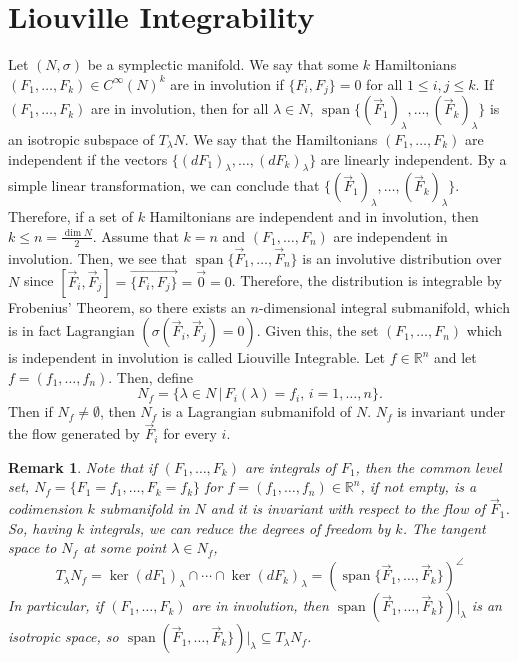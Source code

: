 \documentclass{article}
\newcommand{\R}{\mathbb R}
\newcommand{\nl}{\newline\newline\noindent}
\DeclareMathOperator{\spn}{span}
\newtheorem{rk}{Remark}
\begin{document}
\section{Liouville Integrability}
Let $(N,\sigma)$ be a symplectic manifold. We say that some $k$ Hamiltonians $(F_1,\dots,F_k)\in C^\infty(N)^k$  are in involution if $\{F_i,F_j\} = 0$ for all $1\leq i,j\leq k$. If $(F_1,\dots, F_k)$ are in involution, then for all $\lambda \in N$, $\spn\{(\vec F_1)_\lambda,\dots,(\vec F_k)_\lambda\}$ is an isotropic subspace of $T_\lambda N$.
\nl
We say that the Hamiltonians $(F_1,\dots,F_k)$ are independent if the vectors $\{(dF_1)_\lambda,\dots,(dF_k)_\lambda\}$ are linearly independent. By a simple linear transformation, we can conclude that $\{(\vec F_1)_\lambda,\dots,(\vec F_k)_\lambda\}$. Therefore, if a set of $k$ Hamiltonians are independent and in involution, then $k\leq n = \frac{\dim N}{2}$.
\nl
Assume that $k=n$ and $(F_1,\dots,F_n)$ are independent in involution. Then, we see that $\spn\{\vec F_1,\dots,\vec F_n\}$  is an involutive distribution over $N$ since $[\vec F_i, \vec F_j] =\overrightarrow{\{F_i,F_j\}} = \vec 0 = 0$. Therefore, the distribution is integrable by Frobenius' Theorem, so there exists an $n$-dimensional integral submanifold, which is in fact Lagrangian $(\sigma(\vec F_i,\vec F_j) = 0)$. Given this, the set $(F_1,\dots,F_n)$ which is independent in involution is called Liouville Integrable. Let $f\in \R^n$ and let $f = (f_1,\dots,f_n)$. Then, define
\[N_f = \{\lambda\in N\,|\,F_i(\lambda) = f_i,\,i=1,\dots,n\}.\]
Then if $N_f\neq \emptyset$, then $N_f$ is a Lagrangian submanifold of $N$. $N_f$ is invariant under the flow generated by $\vec F_i$ for every $i$.
\begin{rk}
    Note that if $(F_1,\dots,F_k)$ are integrals of $F_1$, then the common level set, $N_f = \{F_1=f_1,\dots,F_k=f_k\}$ for $f=(f_1,\dots,f_n)\in\R^n$, if not empty, is a codimension $k$ submanifold in $N$ and it is invariant with respect to the flow of $\vec F_1$. So, having $k$ integrals, we can reduce the degrees of freedom by $k$. The tangent space to $N_f$ at some point $\lambda\in N_f$,
    \[T_\lambda N_f = \ker (dF_1)_\lambda\cap\cdots\cap\ker(dF_k)_\lambda = \left(\spn\{\vec F_1,\dots,\vec F_k\}\right)^\angle\]
    In particular, if $(F_1,\dots,F_k)$ are in involution, then $\spn\left(\vec F_1, \dots, \vec F_k\}\right)\big|_\lambda$ is an isotropic space, so $\spn\left(\vec F_1, \dots, \vec F_k\}\right)\big|_\lambda\subseteq T_\lambda N_f$.
\end{rk}
\end{document}
